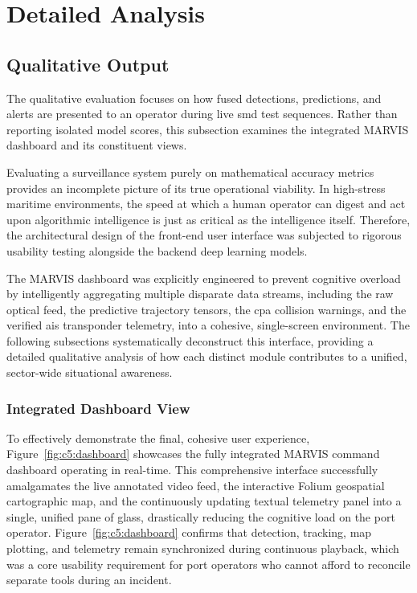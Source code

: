 \section{Detailed Analysis}
\subsection{Qualitative Output}

The qualitative evaluation focuses on how fused detections, predictions, and alerts are presented to an operator during live \gls{smd} test sequences. Rather than reporting isolated model scores, this subsection examines the integrated MARVIS dashboard and its constituent views.

Evaluating a surveillance system purely on mathematical accuracy metrics provides an incomplete picture of its true operational viability. In high-stress maritime environments, the speed at which a human operator can digest and act upon algorithmic intelligence is just as critical as the intelligence itself. Therefore, the architectural design of the front-end user interface was subjected to rigorous usability testing alongside the backend deep learning models. 

The MARVIS dashboard was explicitly engineered to prevent cognitive overload by intelligently aggregating multiple disparate data streams, including the raw optical feed, the predictive trajectory tensors, the \gls{cpa} collision warnings, and the verified \gls{ais} transponder telemetry, into a cohesive, single-screen environment. The following subsections systematically deconstruct this interface, providing a detailed qualitative analysis of how each distinct module contributes to a unified, sector-wide situational awareness.

\subsubsection{Integrated Dashboard View}
\begin{reportfigblock}
To effectively demonstrate the final, cohesive user experience, Figure~\ref{fig:c5:dashboard} showcases the fully integrated MARVIS command dashboard operating in real-time. This comprehensive interface successfully amalgamates the live annotated video feed, the interactive Folium geospatial cartographic map, and the continuously updating textual telemetry panel into a single, unified pane of glass, drastically reducing the cognitive load on the port operator.
Figure~\ref{fig:c5:dashboard} confirms that detection, tracking, map plotting, and telemetry remain synchronized during continuous playback, which was a core usability requirement for port operators who cannot afford to reconcile separate tools during an incident.
\end{reportfigblock}

